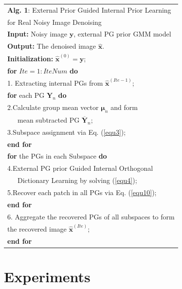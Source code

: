\documentclass[10pt,twocolumn,letterpaper]{article}
\begin{document}
\begin{table}\label{alg1}
\begin{tabular}{l}
\hline
\textbf{Alg. 1}: External Prior Guided Internal Prior Learning
\\
\quad \quad \quad for Real Noisy Image Denoising
\\
\hline
\textbf{Input:} Noisy image $\mathbf{y}$, external PG prior GMM model
\\
\textbf{Output:} The denoised image $\hat{\mathbf{x}}$.
\\
\textbf{Initialization:} $\hat{\mathbf{x}}^{(0)}=\mathbf{y}$;
\\
\textbf{for} $Ite = 1:IteNum$ \textbf{do}
\\
1. Extracting internal PGs from $\hat{\mathbf{x}}^{(Ite-1)}$;
\\
\quad\textbf{for} each PG $\mathbf{Y}_{n}$ \textbf{do}
\\
2.\quad Calculate group mean vector $\bm{\mu}_{n}$ and form 
\\
\quad \ \ \ mean subtracted PG $\mathbf{\overline{Y}}_{n}$;
\\
3.\quad Subspace assignment via Eq. (\ref{equ3});
\\
\quad\textbf{end for}
\\
\quad\textbf{for} the PGs in each Subspace \textbf{do}
\\
4.\quad External PG prior Guided Internal Orthogonal
\\
\quad \ \ \ Dictionary Learning by solving (\ref{equ4});
\\
5.\quad Recover each patch in all PGs via Eq. (\ref{equ10});
\\
\quad\textbf{end for}
\\
6. Aggregate the recovered PGs of all subspaces to form
\\
\quad the recovered image $\hat{\mathbf{x}}^{(Ite)}$;
\\
\textbf{end for}
\\
\hline
\end{tabular}
\end{table}



\section{Experiments}\vspace{-1mm}
\end{document}

